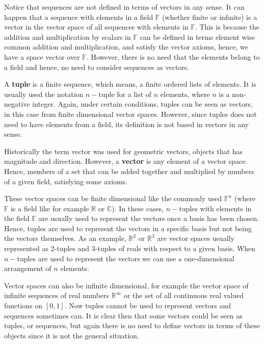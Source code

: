 Notice that sequences are not defined in terms of vectors in any sense. 
It can happen that a sequence with elements in a field $\mathbb{F}$ 
(whether finite or infinite)
is a vector in the vector space of all sequences with elements in $\mathbb{F}$.
This is because the addition and multiplication by scalars in $\mathbb{F}$ 
can be defined in terms element wise common addition and multiplication, 
and satisfy the vector axioms, hence, we have a space vector over $\mathbb{F}$.
However, there is no need that the elements belong to a field and hence, no need 
to consider sequences as vectors. 


A \textbf{tuple} is a finite sequence, which means, a finite ordered lists of elements. 
It is usually used the notation $n-$tuple for a list of $n$ elements, where $n$ is a non-negative integer.
Again, under certain conditions, tuples can be seen as vectors, in this case from finite dimensional vector spaces. 
However, since tuples does not need to have elements from a field, its definition is not based in vectors in any sense. 


Historically the term vector was used for geometric vectors, objects that has magnitude and direction.
However, a \textbf{vector} is any element of a vector space. 
Hence, members of a set that can be added together and multiplied by numbers of a given field, satisfying some axioms.

These vector spaces can be finite dimensional like the commonly used $\mathbb{F}^{n}$ 
(where $\mathbb{F}$ is a field like for example $\mathbb{R}$ or $\mathbb{C}$).
In these cases, $n-$tuples with elements in the field $\mathbb{F}$ are usually used to represent the vectors once a basis has been chosen. 
Hence, tuples are used to represent the vectors in a specific basis but not being the vectors themselves.
As an example, $\mathbb{R}^{2}$ or $\mathbb{R}^{3}$ are vector spaces 
usually represented as 2-tuples and 3-tuples of reals with respect to a given basis.
When $n-$tuples are used to represent the vectors we can use a one-dimensional arrangement of $n$ elements.

Vector spaces can also be infinite dimensional, for example the vector space of infinite sequences of real numbers $\mathbb{R}^\infty$ or 
the set of all continuous real valued functions on $[0,1]$. Now tuples cannot be used to represent vectors and sequences sometimes can.
It is clear then that some vectors could be seen as tuples, or sequences, but again there is no need to define 
vectors in terms of these objects since it is not the general situation. 

